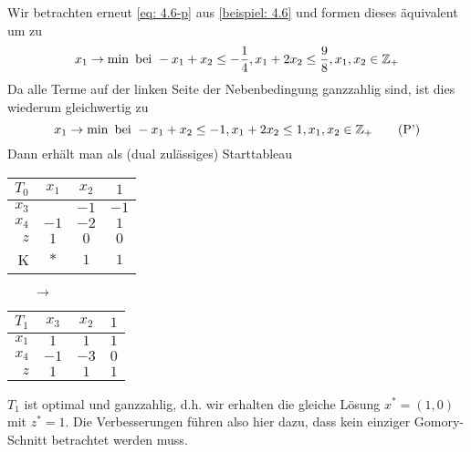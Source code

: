 \begin{beispiel}
	Wir betrachten erneut \eqref{eq: 4.6-p} aus \cref{beispiel: 4.6} und formen dieses äquivalent um zu
	\begin{equation*}
		x_1 \to \min \text{ bei } -x_1 + x_2 \le -\frac{1}{4}, x_1 + 2x_2 \le \frac{9}{8}, x_1, x_2 \in \mathbb{Z}_+
	\end{equation*}
	Da alle Terme auf der linken Seite der Nebenbedingung ganzzahlig sind, ist dies wiederum gleichwertig zu
	\begin{equation*}
		x_1 \to \min \text{ bei } -x_1 + x_2 \le -1, x_1 + 2x_2 \le 1, x_1, x_2 \in \mathbb{Z}_+
		\tag{P'} \label{eq: 4.-p'}
	\end{equation*}
	Dann erhält man als (dual zulässiges) Starttableau
	\begin{center}
		\begin{tabular}{r|cc|c}
			$T_0$ & $x_1$ & $x_2$ & $1$ \\ \hline
			$x_3$ & \fbox{$1$} & $-1$ & $-1$ \\
			$x_4$ & $-1$ & $-2$ & $1$ \\ \hline
			$z$ & $1$ & $0$ & $0$ \\
			K & $\ast$ & $1$  & $1$ \\
		\end{tabular}
		$\qquad \longrightarrow \qquad$	
		\begin{tabular}{r|cc|c}
			$T_1$ & $x_3$ & $x_2$ & $1$ \\ \hline
			$x_1$ & $1$ & $1$ & $1$ \\
			$x_4$ & $-1$ & $-3$ & $0$ \\ \hline
			$z$ & $1$ & $1$ & $1$ \\
		\end{tabular}
	\end{center}	
	
	$T_1$ ist optimal und ganzzahlig, d.h. wir erhalten die gleiche Lösung $x^\ast = (1,0)$ mit $z^\ast = 1$.
	Die Verbesserungen führen also hier dazu, dass kein einziger Gomory-Schnitt betrachtet werden muss.
\end{beispiel}